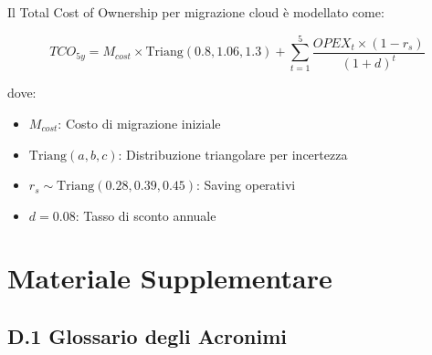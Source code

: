 Il Total Cost of Ownership per migrazione cloud è modellato come:

\begin{equation}
TCO_{5y} = M_{cost} \times \text{Triang}(0.8, 1.06, 1.3) + \sum_{t=1}^{5} \frac{OPEX_t \times (1 - r_s)}{(1 + d)^t}
\label{eq:tco}
\end{equation}

dove:
\begin{itemize}
    \item $M_{cost}$: Costo di migrazione iniziale
    \item $\text{Triang}(a,b,c)$: Distribuzione triangolare per incertezza
    \item $r_s \sim \text{Triang}(0.28, 0.39, 0.45)$: Saving operativi
    \item $d = 0.08$: Tasso di sconto annuale
\end{itemize}


\chapter{Materiale Supplementare}
\label{app:supplementare}

\section{D.1 Glossario degli Acronimi}

